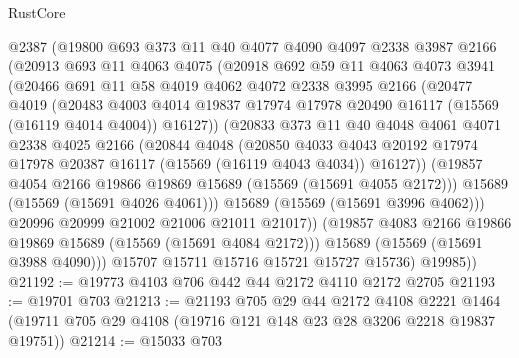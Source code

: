 \begin{lexlean}{RustCore}
\begin{coremodule}
          @2387
          (@19800
            @693
            @373
            @11
            @40
            @4077
            @4090
            @4097
            @2338
            @3987
            @2166
            (@20913
              @693
              @11
              @4063
              @4075
              (@20918
                @692
                @59
                @11
                @4063
                @4073
                @3941
                (@20466
                  @691
                  @11
                  @58
                  @4019
                  @4062
                  @4072
                  @2338
                  @3995
                  @2166
                  (@20477
                    @4019
                    (@20483
                      @4003
                      @4014
                      @19837
                      @17974
                      @17978
                      @20490
                      @16117
                      (@15569 (@16119 @4014 @4004))
                      @16127))
                  (@20833
                    @373
                    @11
                    @40
                    @4048
                    @4061
                    @4071
                    @2338
                    @4025
                    @2166
                    (@20844
                      @4048
                      (@20850
                        @4033
                        @4043
                        @20192
                        @17974
                        @17978
                        @20387
                        @16117
                        (@15569 (@16119 @4043 @4034))
                        @16127))
                    (@19857 @4054 @2166 @19866 @19869 @15689 (@15569 (@15691 @4055 @2172)))
                    @15689
                    (@15569 (@15691 @4026 @4061)))
                  @15689
                  (@15569 (@15691 @3996 @4062)))
                @20996
                @20999
                @21002
                @21006
                @21011
                @21017))
            (@19857 @4083 @2166 @19866 @19869 @15689 (@15569 (@15691 @4084 @2172)))
            @15689
            (@15569 (@15691 @3988 @4090)))
          @15707
          @15711
          @15716
          @15721
          @15727
          @15736)
        @19985))
@21192 := @19773 @4103 @706 @442 @44 @2172 @4110 @2172 @2705
@21193 := @19701 @703
@21213 := @21193
    @705
    @29
    @44
    @2172
    @4108
    @2221
    @1464
    (@19711 @705 @29 @4108 (@19716 @121 @148 @23 @28 @3206 @2218 @19837 @19751))
@21214 := @15033 @703

\end{coremodule}
\end{lexlean}
